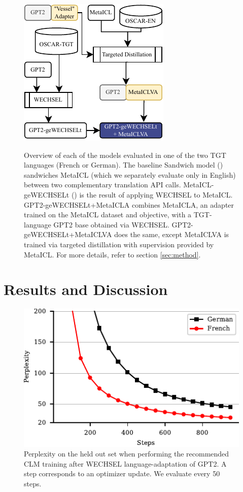 \documentclass[11pt]{article}
\begin{document}
\begin{figure}[ht]
	\hfill
	\subcaptionbox{}
	{\includegraphics{gpt2-gewechselt+metaiclva.pdf}}
	\caption{Overview of each of the models evaluated in one of the two TGT
		languages (French or German). The baseline
		\textcolor[HTML]{79d6ae}{Sandwich} model () sandwiches
		\textcolor[HTML]{332345}{MetaICL} \citep{min_metaicl_2022} (which we
		separately evaluate only in English) between two complementary translation
		API calls. \textcolor[HTML]{38AAAC}{MetaICL-geWECHSELt}
		() is the result of applying WECHSEL
		\citep{minixhofer_wechsel_2022} to MetaICL.
		\textcolor[HTML]{357aa2}{GPT2-geWECHSELt+MetaICLA} combines
		\textcolor{Dandelion}{MetaICLA}, an adapter trained on the MetaICL dataset
		and objective, with a TGT-language GPT2 base obtained via WECHSEL.
		\textcolor[HTML]{40498e}{GPT2-geWECHSELt+MetaICLVA} does the same, except
		\textcolor{Dandelion}{MetaICLVA} is trained via targeted distillation with
		supervision provided by MetaICL. For more details, refer to section
		\ref{sec:method}.}
\end{figure}

\section{Results and Discussion}
\begin{figure}[ht]
	\centering
	\includegraphics[width=0.9\linewidth]{gpt2-w_ppl.pdf}
	\caption{Perplexity on the held out set when performing the recommended CLM training after WECHSEL
		language-adaptation of GPT2. A step corresponds to an optimizer update. We evaluate every 50
		steps.}
	\label{fig:gpt2-w_ppl}
\end{figure}
\end{document}
